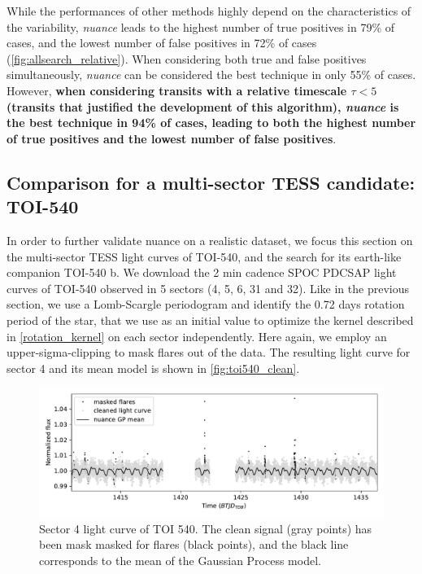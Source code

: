 \documentclass[modern]{aastex631}
\newcommand{\nuancemethod}{\textit{nuance}}
\newcommand{\nuance}{\nuancemethod{}}
\begin{document}
While the performances of other methods highly depend on the characteristics of the variability, \nuance{} leads to the highest number of true positives in 79\% of cases, and the lowest number of false positives in 72\% of cases (\autoref{fig:allsearch_relative}). When considering both true and false positives simultaneously, \nuance{} can be considered the best technique in only 55\% of cases. However, \textbf{when considering transits with a relative timescale $\tau < 5$ (transits that justified the development of this algorithm), \nuancemethod{} is the best technique in 94\% of cases, leading to both the highest number of true positives and the lowest number of false positives}.

\subsection{Comparison for a multi-sector TESS candidate: TOI-540}\label{toi540}

In order to further validate nuance on a realistic dataset, we focus this section on the multi-sector TESS light curves of TOI-540, and the search for its earth-like companion TOI-540 b. We download the 2 min cadence SPOC PDCSAP light curves of TOI-540 observed in 5 sectors (4, 5, 6, 31 and 32). Like in the previous section, we use a Lomb-Scargle periodogram and identify the 0.72 days rotation period of the star, that we use as an initial value to optimize the kernel described in \autoref{rotation_kernel} on each sector independently. Here again, we employ an upper-sigma-clipping to mask flares out of the data. The resulting light curve for sector 4 and its mean model is shown in \autoref{fig:toi540_clean}.
\begin{figure}[H]
    \begin{centering}
        \includegraphics[width=\linewidth]{../workflows/comparison_toi/figures/TOI 540/4.pdf}
        \caption{Sector 4 light curve of TOI 540. The clean signal (gray points) has been mask masked for flares (black points), and the black line corresponds to the mean of the Gaussian Process model.}
        \label{fig:toi540_clean}
    \end{centering}
\end{figure}
\end{document}
